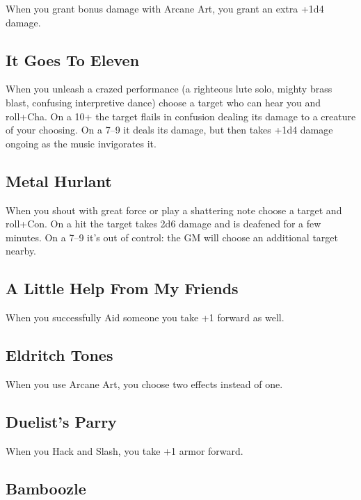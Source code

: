 When you grant bonus damage with Arcane Art, you grant an extra +1d4 damage.

 
\subsection{It Goes To Eleven}   
 

When you unleash a crazed performance (a righteous lute solo, mighty brass blast, confusing interpretive dance) choose a target who can hear you and roll+Cha. On a 10+ the target flails in confusion dealing its damage to a creature of your choosing. On a 7–9 it deals its damage, but then takes +1d4 damage ongoing as the music invigorates it.

 
\subsection{Metal Hurlant}    
 

When you shout with great force or play a shattering note choose a target and roll+Con. On a hit the target takes 2d6 damage and is deafened for a few minutes. On a 7–9 it's out of control: the GM will choose an additional target nearby.

 
\subsection{A Little Help From My Friends}   
 

When you successfully Aid someone you take +1 forward as well.

 
\subsection{Eldritch Tones}    
 

When you use Arcane Art, you choose two effects instead of one.

 
\subsection{Duelist's Parry}    
 

When you Hack and Slash, you take +1 armor forward.

 
\subsection{Bamboozle}   
 

